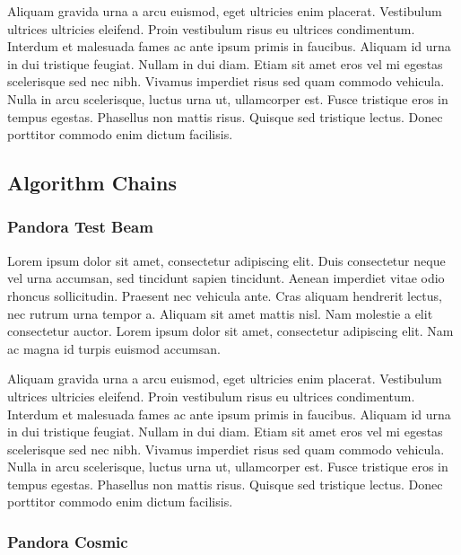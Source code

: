 Aliquam gravida urna a arcu euismod, eget ultricies enim placerat. Vestibulum ultrices ultricies eleifend. Proin vestibulum risus eu ultrices condimentum. Interdum et malesuada fames ac ante ipsum primis in faucibus. Aliquam id urna in dui tristique feugiat. Nullam in dui diam. Etiam sit amet eros vel mi egestas scelerisque sed nec nibh. Vivamus imperdiet risus sed quam commodo vehicula. Nulla in arcu scelerisque, luctus urna ut, ullamcorper est. Fusce tristique eros in tempus egestas. Phasellus non mattis risus. Quisque sed tristique lectus. Donec porttitor commodo enim dictum facilisis.

\subsection{Algorithm Chains}

\subsubsection{Pandora Test Beam}

Lorem ipsum dolor sit amet, consectetur adipiscing elit. Duis consectetur neque vel urna accumsan, sed tincidunt sapien tincidunt. Aenean imperdiet vitae odio rhoncus sollicitudin. Praesent nec vehicula ante. Cras aliquam hendrerit lectus, nec rutrum urna tempor a. Aliquam sit amet mattis nisl. Nam molestie a elit consectetur auctor. Lorem ipsum dolor sit amet, consectetur adipiscing elit. Nam ac magna id turpis euismod accumsan.

Aliquam gravida urna a arcu euismod, eget ultricies enim placerat. Vestibulum ultrices ultricies eleifend. Proin vestibulum risus eu ultrices condimentum. Interdum et malesuada fames ac ante ipsum primis in faucibus. Aliquam id urna in dui tristique feugiat. Nullam in dui diam. Etiam sit amet eros vel mi egestas scelerisque sed nec nibh. Vivamus imperdiet risus sed quam commodo vehicula. Nulla in arcu scelerisque, luctus urna ut, ullamcorper est. Fusce tristique eros in tempus egestas. Phasellus non mattis risus. Quisque sed tristique lectus. Donec porttitor commodo enim dictum facilisis.


\subsubsection{Pandora Cosmic}

